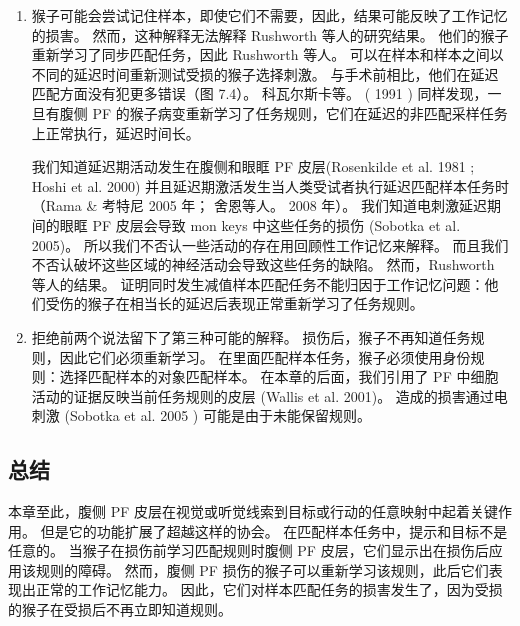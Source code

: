 \begin{enumerate}
\item 猴子可能会尝试记住样本，即使它们不需要，因此，结果可能反映了工作记忆的损害。
然而，这种解释无法解释 Rushworth 等人的研究结果。 
他们的猴子重新学习了同步匹配任务，因此 Rushworth 等人。 可以在样本和样本之间以不同的延迟时间重新测试受损的猴子选择刺激。 
与手术前相比，他们在延迟匹配方面没有犯更多错误（图 7.4）。 
科瓦尔斯卡等。 ( 1991 ) 同样发现，一旦有腹侧 PF 的猴子病变重新学习了任务规则，它们在延迟的非匹配采样任务上正常执行，延迟时间长。
\par
我们知道延迟期活动发生在腹侧和眼眶 PF 皮层(Rosenkilde et al. 1981 ; Hoshi et al. 2000) 并且延迟期激活发生当人类受试者执行延迟匹配样本任务时（Rama \& 考特尼 2005 年； 舍恩等人。 2008 年）。 
我们知道电刺激延迟期间的眼眶 PF 皮层会导致 mon keys 中这些任务的损伤 (Sobotka et al. 2005)。 
所以我们不否认一些活动的存在用回顾性工作记忆来解释。 
而且我们不否认破坏这些区域的神经活动会导致这些任务的缺陷。 
然而，Rushworth 等人的结果。 
证明同时发生减值样本匹配任务不能归因于工作记忆问题：他们受伤的猴子在相当长的延迟后表现正常重新学习了任务规则。
\item 拒绝前两个说法留下了第三种可能的解释。 
损伤后，猴子不再知道任务规则，因此它们必须重新学习。 
在里面匹配样本任务，猴子必须使用身份规则：选择匹配样本的对象匹配样本。 
在本章的后面，我们引用了 PF 中细胞活动的证据反映当前任务规则的皮层 (Wallis et al. 2001)。 
造成的损害通过电刺激 (Sobotka et al. 2005 ) 可能是由于未能保留规则。
\end{enumerate}
\subsection{总结}
\par 
本章至此，腹侧 PF 皮层在视觉或听觉线索到目标或行动的任意映射中起着关键作用。 
但是它的功能扩展了超越这样的协会。 
在匹配样本任务中，提示和目标不是任意的。 
当猴子在损伤前学习匹配规则时腹侧 PF 皮层，它们显示出在损伤后应用该规则的障碍。
然而，腹侧 PF 损伤的猴子可以重新学习该规则，此后它们表现出正常的工作记忆能力。 
因此，它们对样本匹配任务的损害发生了，因为受损的猴子在受损后不再立即知道规则。
